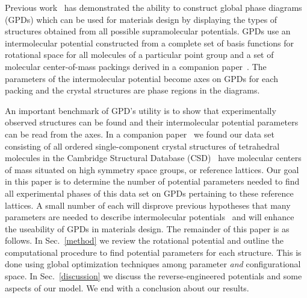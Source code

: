\documentclass[preprint]{revtex4}
\begin{document}
Previous work~\cite{Keith04c,Mettes04} has demonstrated the ability
to construct global phase diagrams (GPDs) which can be used for
materials design by displaying the types of structures obtained from
all possible supramolecular potentials. GPDs use an
intermolecular potential constructed from a complete set of basis
functions for rotational space for all molecules of a particular
point group and a set of molecular center-of-mass packings derived
in a companion paper~\cite{McClurg05}. The parameters of the
intermolecular potential become axes on GPDs for each packing and
the crystal structures are phase regions in the diagrams.

An important benchmark of GPD's utility is to show that
experimentally observed structures can be found and their
intermolecular potential parameters can be read from the axes.
In a companion paper~\cite{McClurg05} we found our data set consisting of
all ordered single-component crystal structures of
tetrahedral molecules in the Cambridge Structural Database
(CSD)~\cite{Allen02} have molecular centers of mass situated on
high symmetry space groups, or reference lattices. Our goal
in this paper is to determine the number of potential parameters needed
to find all experimental phases of this data set on GPDs pertaining to these
reference lattices.  A small number of each will
disprove previous hypotheses that many parameters are
needed to describe intermolecular potentials~\cite{Briels80}
and will enhance the useability of GPDs in
materials design. The remainder of this paper is as follows. In Sec.~\ref{method} we
review the rotational potential and outline the computational
procedure to find potential parameters for each structure. This
is done using global optimization techniques among parameter
\emph{and} configurational space. In Sec.~\ref{discussion} we
discuss the reverse-engineered potentials and some aspects of our model. We end with a conclusion
about our results.

\end{document}
